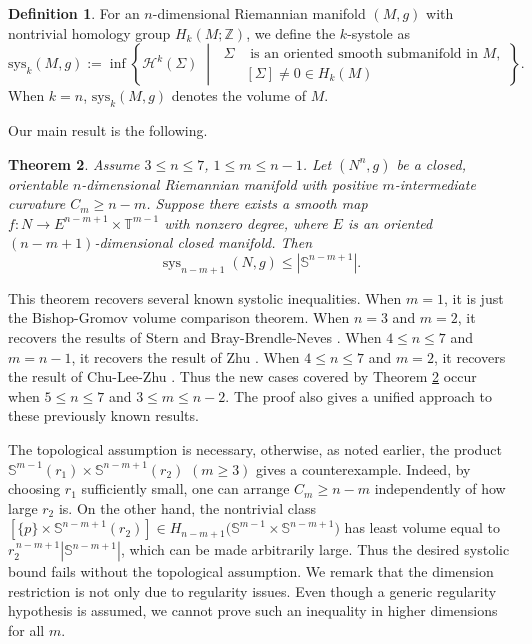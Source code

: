 \documentclass[11pt]{amsart}
\newtheorem{theorem}{Theorem}[section]
\theoremstyle{definition}
\newtheorem{definition}[theorem]{Definition}
\theoremstyle{remark}
\numberwithin{equation}{section}
\begin{document}
\begin{definition}
For an $n$-dimensional Riemannian manifold $(M,g)$ with nontrivial homology group $H_{k}(M;\mathbb{Z})$, we
  define the $k$-systole as
\begin{equation*}
    \text{sys}_{k}(M, g) := \inf \left\{ \mathcal{H}^k(\Sigma) \;\middle|\;
\begin{aligned}
\Sigma  &\text{ is an oriented smooth submanifold in } M, \\
&[\Sigma] \neq 0 \in H_{k}(M)
\end{aligned} \right\}.
\end{equation*}
When $k=n$, $\text{sys}_{k}(M, g)$ denotes the volume of $M$.
\end{definition}

Our main result is the following.
    \begin{theorem}\label{vol inequality in Cm case in the introduction}
    Assume \(3 \leq  n \leq  7\), \(1 \leq  m \leq  n-1\). Let $(N^{n},g)$ be a closed, orientable
      $n$-dimensional Riemannian manifold with positive $m$-intermediate curvature $C_{m}\geq n-m$.
      Suppose there exists a smooth map $f:N\rightarrow E^{n-m+1}\times \mathbb{T}^{m-1}$
      with nonzero degree, where $E$ is an oriented $(n-m+1)$-dimensional closed manifold.  Then
    \begin{equation}\label{maininequality}
        \operatorname{sys}_{n-m+1}(N,g)\leq  |\mathbb{S}^{n-m+1}|.
    \end{equation}
\end{theorem}

This theorem recovers several known systolic inequalities. When $m=1$, it is just the
  Bishop-Gromov volume comparison theorem. When $n=3$ and $m=2$, it recovers the results of Stern
  \cite{stern-scalar-curvature-harmonic-maps} and Bray-Brendle-Neves
  \cite{BrayBrenleNevesrigidity}. When $4\leq n\leq7$ and $m=n-1$, it
  recovers the result of Zhu \cite{zhu-spherical-systole-dimension-two}. When $4\leq n\leq7$
  and $m=2$, it recovers the result of Chu-Lee-Zhu
  \cite{chuleezhu_n_systole}. Thus the new cases covered by Theorem
  \ref{vol inequality in Cm case in the introduction} occur when $5\leq n\leq7$ and
  $3\leq m\leq n-2$. The proof also gives a unified approach to these previously known results.

The topological assumption is necessary, otherwise, as noted earlier, the product
  $\mathbb{S}^{m-1}(r_1)\times \mathbb{S}^{n-m+1}(r_2)$ $(m\geq 3)$ gives a counterexample. Indeed, by
  choosing $r_1$ sufficiently small, one can arrange $C_m\geq n-m$ independently of how large
  $r_2$ is. On the other hand, the nontrivial class
  $[\{p\}\times \mathbb{S}^{n-m+1}(r_2)]\in
  H_{n-m+1}\big(\mathbb{S}^{m-1}\times\mathbb{S}^{n-m+1}\big)$ has least volume equal to
  $r_2^{\,n-m+1}|\mathbb{S}^{n-m+1}|$, which can be made arbitrarily large. Thus the desired
  systolic bound fails without the topological assumption. We remark that the dimension
  restriction is not only due to regularity issues. Even though a generic regularity
  hypothesis is assumed, we cannot prove such an inequality in higher dimensions for all $m$.
\end{document}
